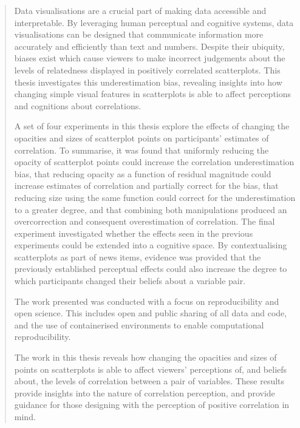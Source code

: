 \begin{abstract} %
Data visualisations are a crucial part of making data accessible and interpretable. By leveraging human perceptual and cognitive systems, data visualisations can be designed that communicate information more accurately and efficiently than text and numbers. Despite their ubiquity, biases exist which cause viewers to make incorrect judgements about the levels of relatedness displayed in positively correlated scatterplots. This thesis investigates this underestimation bias, revealing insights into how changing simple visual features in scatterplots is able to affect perceptions and cognitions about correlations.

A set of four experiments in this thesis explore the effects of changing the opacities and sizes of scatterplot points on participants' estimates of correlation. To summarise, it was found that uniformly reducing the opacity of scatterplot points could increase the correlation underestimation bias, that reducing opacity as a function of residual magnitude could increase estimates of correlation and partially correct for the bias, that reducing size using the same function could correct for the underestimation to a greater degree, and that combining both manipulations produced an overcorrection and consequent overestimation of correlation. The final experiment investigated whether the effects seen in the previous experiments could be extended into a cognitive space. By contextualising scatterplots as part of news items, evidence was provided that the previously established perceptual effects could also increase the degree to which participants changed their beliefs about a variable pair.

The work presented was conducted with a focus on reproducibility and open science. This includes open and public sharing of all data and code, and the use of containerised environments to enable computational reproducibility.

The work in this thesis reveals how changing the opacities and sizes of points on scatterplots is able to affect viewers' perceptions of, and beliefs about, the levels of correlation between a pair of variables. These results provide insights into the nature of correlation perception, and provide guidance for those designing with the perception of positive correlation in mind.
\vspace{-1cm}
\end{abstract}%
\uomdeclarations %

